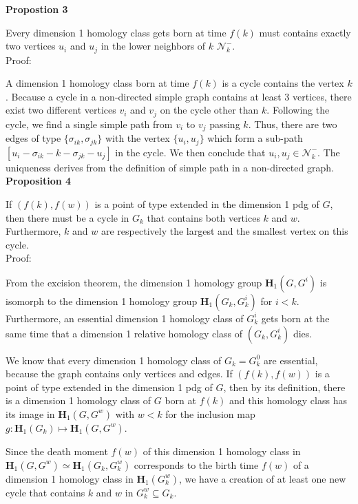 \documentclass[a4paper,12pt]{article}
\numberwithin{equation}{section}
\begin{document}
	\noindent \textbf{Propostion 3}
	
	Every dimension 1 homology class gets born at time $f(k)$ must contains exactly two vertices $u_i$ and $u_j$ in the lower neighbors of $k$ $\mathcal{N}_k^-$.\\
	
	\noindent Proof:
	
	A dimension 1 homology class born at time $f(k)$ is a cycle contains the vertex $k$. Because a cycle in a non-directed simple graph contains at least 3 vertices, there exist two different vertices $v_i$ and $v_j$ on the cycle other than $k$. Following the cycle, we find a single simple path from $v_i$ to $v_j$ passing $k$. Thus, there are two edges of type $\{\sigma_{ik}, \sigma_{jk}\}$ with the vertex $\{u_i, u_j\}$ which form a sub-path
	$[u_i - \sigma_{ik}- k - \sigma_{jk} - u_j]$ in the cycle. We then conclude that $u_i, u_j \in \mathcal{N}_k^-$. The uniqueness derives from the definition of simple path in a non-directed graph.\\ 
		
	\noindent \textbf{Proposition 4}
	
	If $(f(k),f(w))$ is a point of type extended in the dimension 1 pdg of $G$, then there must be a cycle in $G_k$ that contains both vertices $k$ and $w$. Furthermore, $k$ and $w$ are respectively the largest and the smallest vertex on this cycle.\\
	
	\noindent Proof: 
	
	From the excision theorem, the dimension 1 homology group $\mathbf{H}_1(G,G^i)$ is isomorph to the dimension 1 homology group $\mathbf{H}_1(G_k, G_k^i)$ for $i < k$. Furthermore, an essential dimension 1 homology class of $G^i_k$ gets born at the same time that a dimension 1 relative homology class of $(G_k, G_k^i)$ dies. 
	
	We know that every dimension 1 homology class of $G_k = G^0_k$ are essential, because the graph contains only vertices and edges. If $(f(k),f(w))$ is a point of type extended in the dimension 1 pdg of $G$, then by its definition, there is a dimension 1 homology class of $G$ born at $f(k)$ and this homology class has its image in $\mathbf{H}_1(G,G^w)$ with $w<k$ for the inclusion map $g: \mathbf{H}_1(G_k) \mapsto \mathbf{H}_1(G,G^w)$.  
	
	Since the death moment $f(w)$ of this dimension 1 homology class in $\mathbf{H}_1(G,G^w) \simeq \mathbf{H}_1(G_k,G_k^w)$ corresponds to the birth time $f(w)$ of a dimension 1 homology class in $\mathbf{H}_1(G_k^w)$, we have a creation of at least one new cycle that contains $k$ and $w$ in $G_k^w \subseteq G_k$. 
	
\end{document}

